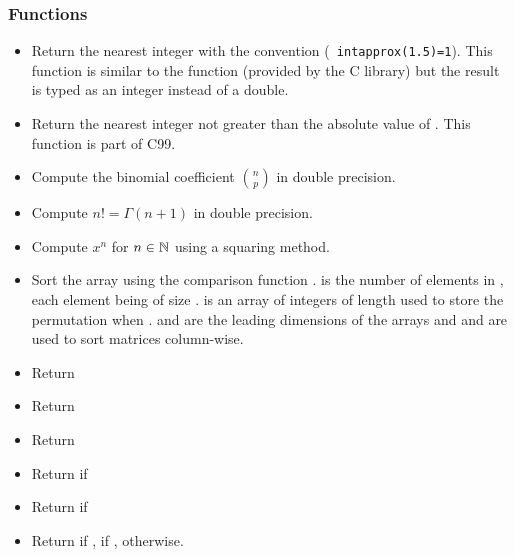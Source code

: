 \subsubsection{Functions}
\begin{itemize}
\item {}
  \sshortdescribe Return the nearest integer with the convention ({\tt
  intapprox(1.5)=1}). This function is similar to the  function
  (provided by the C library) but the result is typed as an integer instead of a
  double.

\item {}
  \sshortdescribe Return the nearest integer not greater than the absolute
  value of . This function is part of C99.

\item {}
  \sshortdescribe Compute the binomial coefficient $\binom{n}{p}$ in double
  precision.

\item {}
  \sshortdescribe Compute $n! = \Gamma(n+1)$ in double precision.

\item {}
  \sshortdescribe Compute $x^n$ for $n \in {\mathbb N}$ using a squaring method.


\item {}
  \sshortdescribe Sort the array  using the comparison function
  .  is the number of elements in , each element being of
  size .  is an array of integers of length  used to store
  the permutation when .  and  are the
  leading dimensions of the arrays  and  and are used to sort
  matrices column-wise. 

\item {}
  \sshortdescribe Return 

\item {}
  \sshortdescribe Return  

\item {}
  \sshortdescribe Return  

\item {}
  \sshortdescribe Return  if 

\item {}
  \sshortdescribe Return  if 

\item {}
  \sshortdescribe Return  if ,  if ,
   otherwise.
\end{itemize}

